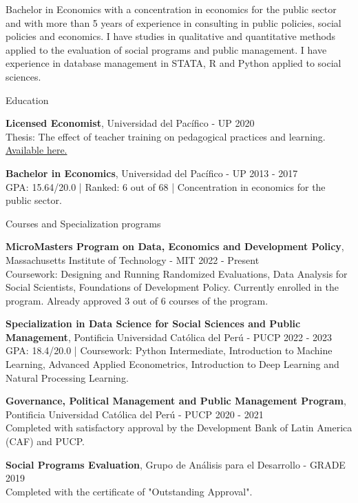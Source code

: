 \documentclass{resume} %
\begin{document}
\item {Bachelor in Economics with a concentration in economics for the public sector and with more than 5 years of experience in consulting in public policies, social policies and economics. I have studies in qualitative and quantitative methods applied to the evaluation of social programs and public management. I have experience in database management in STATA, R and Python applied to social sciences.}


\begin{rSection}{Education}

{\bf Licensed Economist}, Universidad del Pacífico - UP \hfill {2020} \\
Thesis: The effect of teacher training on pedagogical practices and learning. \href{https://repositorio.up.edu.pe/handle/11354/2653}{Available here.}

{\bf Bachelor in Economics}, Universidad del Pacífico - UP \hfill {2013 - 2017}\\
GPA: 15.64/20.0 | Ranked: 6 out of 68 | Concentration in economics for the public sector.

\end{rSection}


\begin{rSection}{Courses and Specialization programs}

{\bf MicroMasters Program on Data, Economics and Development Policy}, Massachusetts Institute of Technology - MIT \hfill {2022 - Present}\\
Coursework: Designing and Running Randomized Evaluations, Data Analysis for Social Scientists, Foundations of Development Policy.
Currently enrolled in the program. Already approved 3 out of 6 courses of the program.

{\bf Specialization in Data Science for Social Sciences and Public Management}, Pontificia Universidad Católica del Perú - PUCP \hfill {2022 - 2023}\\
GPA: 18.4/20.0 | Coursework: Python Intermediate, Introduction to Machine Learning, Advanced Applied Econometrics, Introduction to Deep Learning and Natural Processing Learning.

{\bf Governance, Political Management and Public Management Program}, Pontificia Universidad Católica del Perú - PUCP \hfill {2020 - 2021}\\
Completed with satisfactory approval by the Development Bank of Latin America (CAF) and PUCP. 

{\bf Social Programs Evaluation}, Grupo de Análisis para el Desarrollo - GRADE \hfill {2019}\\
Completed with the certificate of "Outstanding Approval". 
\end{rSection}
\end{document}
